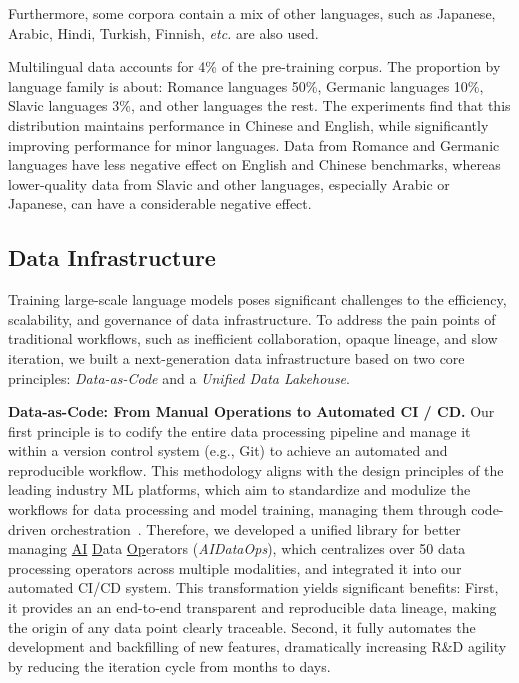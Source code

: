 Furthermore, some corpora contain a mix of other languages, such as Japanese, Arabic, Hindi, Turkish, Finnish, \emph{etc.} are also used. 

Multilingual data accounts for 4\% of the pre-training corpus. The proportion by language family is about: Romance languages 50\%, Germanic languages 10\%, Slavic languages 3\%, and other languages the rest. The experiments find that this distribution maintains performance in Chinese and English, while significantly improving performance for minor languages. Data from Romance and Germanic languages have less negative effect on English and Chinese benchmarks, whereas lower-quality data from Slavic and other languages, especially Arabic or Japanese, can have a considerable negative effect. 

\subsection{Data Infrastructure}\label{appendix:data:infra}
Training large-scale language models poses significant challenges to the efficiency, scalability, and governance of data infrastructure. To address the pain points of traditional workflows, such as inefficient collaboration, opaque lineage, and slow iteration, we built a next-generation data infrastructure based on two core principles: \emph{Data-as-Code} and a \emph{Unified Data Lakehouse}.

{\bfseries Data-as-Code: From Manual Operations to Automated CI / CD. }
Our first principle is to codify the entire data processing pipeline and manage it within a version control system (e.g., Git) to achieve an automated and reproducible workflow. This methodology aligns with the design principles of the leading industry ML platforms, which aim to standardize and modulize the workflows for data processing and model training, managing them through code-driven orchestration~\citep{datainfra1}. Therefore, we developed a unified library for better managing \underline{AI} \underline{D}ata \underline{Op}erators (\emph{AIDataOps}), which centralizes over 50 data processing operators across multiple modalities, and integrated it into our automated CI/CD system. This transformation yields significant benefits: First, it provides an an end-to-end transparent and reproducible data lineage, making the origin of any data point clearly traceable. Second, it fully automates the development and backfilling of new features, dramatically increasing R\&D agility by reducing the iteration cycle from months to days.


